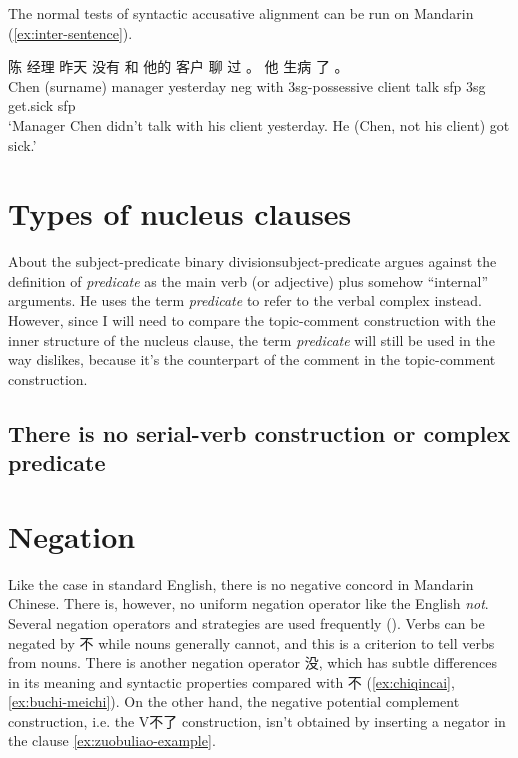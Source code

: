 \documentclass[UTF8, a4paper, oneside, scheme=plain]{ctexrep}
\newcommand*{\term}[1]{\emph{#1}}
\newcommand{\translate}[1]{`#1'}
\begin{document}
The normal tests of syntactic accusative alignment can be run on Mandarin
(\ref{ex:inter-sentence}).

\begin{exe}
    \ex \gll 陈 经理 昨天 没有 和 他的 客户 聊 过 。 他 生病 了 。 \\
    {Chen (surname)} manager yesterday \acs{neg} with 3sg-\acs{possessive} client talk \acs{sfp}
    {} 3sg get.sick \acs{sfp} \\
    \glt \translate{Manager Chen didn't talk with his client yesterday. He (Chen, not his client) got sick.}
    \label{ex:inter-sentence}
\end{exe}

\section{Types of nucleus clauses}

\begin{infobox}{About the subject-predicate binary division}{subject-predicate}
    \citet{dixon2009basic} argues against the definition of \term{predicate} 
    as the main verb (or adjective) plus somehow ``internal'' arguments.
    He uses the term \term{predicate} to refer to the verbal complex instead.
    However, since I will need to compare the topic-comment construction 
    with the inner structure of the nucleus clause,
    the term \term{predicate} will still be used in the way \citet{dixon2009basic} dislikes,
    because it's the counterpart of the comment in the topic-comment construction.
\end{infobox}

\subsection{There is no serial-verb construction or complex predicate}\label{sec:no-serial-verb}

\section{Negation}\label{sec:negation}

Like the case in standard English, 
there is no negative concord in Mandarin Chinese.
There is, however, no uniform negation operator like the English \emph{not}. 
Several negation operators and strategies are used frequently ().
Verbs can be negated by 不 while nouns generally cannot, 
and this is a criterion to tell verbs from nouns. 
There is another negation operator 没, 
which has subtle differences in its meaning and syntactic properties compared with 不
(\ref{ex:chiqincai}, \ref{ex:buchi-meichi}).
On the other hand, the negative potential complement construction,
i.e. the V不了 construction,
isn't obtained by inserting a negator in the clause \eqref{ex:zuobuliao-example}.
\end{document}

